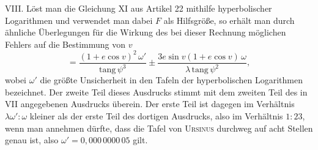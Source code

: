 VIII. Löst man die Gleichung XI aus Artikel 22 mithilfe hyperbolischer Logarithmen und verwendet man dabei $F$ als Hilfsgröße, so erhält man durch ähnliche Überlegungen für die Wirkung des bei dieser Rechnung möglichen Fehlers auf die Bestimmung von $v$
\[
= \frac{(1+e\cos v)^2\,\omega'}{\mathrm{tang}\,\psi^3} \pm \frac{3e\sin v(1+e\cos v)\,\omega}{\lambda\,\mathrm{tang}\,\psi^2},
\]
wobei $\omega'$ die größte Unsicherheit in den Tafeln der hyperbolischen Logarithmen bezeichnet. Der zweite Teil dieses Ausdrucks stimmt mit dem zweiten Teil des in VII angegebenen Ausdrucks überein. Der erste Teil ist dagegen im Verhältnis $\lambda\omega' : \omega$ kleiner als der erste Teil des dortigen Ausdrucks, also im Verhältnis $1:23$, wenn man annehmen dürfte, dass die Tafel von \textsc{Ursinus} durchweg auf acht Stellen genau ist, also $\omega' = 0{,}000\,0000\,05$ gilt.
